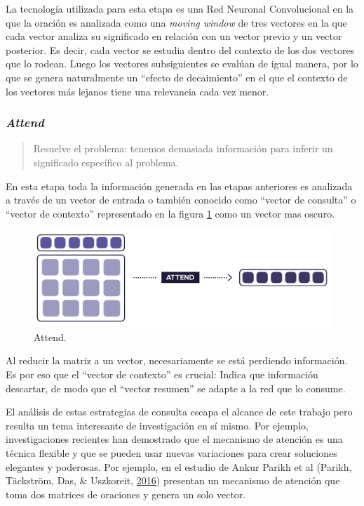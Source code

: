 \documentclass[12pt,a4paper,]{scrartcl}
\begin{document}
La tecnología utilizada para esta etapa es una Red Neuronal Convolucional en la que la oración es analizada como una \emph{moving window} de tres vectores en la que cada vector analiza su significado en relación con un vector previo y un vector posterior. Es decir, cada vector se estudia dentro del contexto de los dos vectores que lo rodean. Luego los vectores subsiguientes se evalúan de igual manera, por lo que se genera naturalmente un \enquote{efecto de decaimiento} en el que el contexto de los vectores más lejanos tiene una relevancia cada vez menor.

\hypertarget{attend}{%
\subsubsection{\texorpdfstring{\emph{Attend}}{Attend}}\label{attend}}

\begin{quote}
Resuelve el problema: tenemos demasiada información para inferir un significado específico al problema.
\end{quote}

En esta etapa toda la información generada en las etapas anteriores es analizada a través de un vector de entrada o también conocido como \enquote{vector de consulta} o \enquote{vector de contexto} representado en la figura \ref{fig:formula-attend} como un vector mas oscuro.

\begin{figure}[H]

{\centering \includegraphics{assets/deep-learning-formula-nlp_attend.pdf} 

}

\caption{Attend.}\label{fig:formula-attend}
\end{figure}

Al reducir la matriz a un vector, necesariamente se está perdiendo información. Es por eso que el \enquote{vector de contexto} es crucial: Indica que información descartar, de modo que el \enquote{vector resumen} se adapte a la red que lo consume.

El análisis de estas estrategias de consulta escapa el alcance de este trabajo pero resulta un tema interesante de investigación en sí mismo. Por ejemplo, investigaciones recientes han demostrado que el mecanismo de atención es una técnica flexible y que se pueden usar nuevas variaciones para crear soluciones elegantes y poderosas. Por ejemplo, en el estudio de Ankur Parikh et al (Parikh, Täckström, Das, \& Uszkoreit, \protect\hyperlink{ref-parikh-etal-2016-decomposable}{2016}) presentan un mecanismo de atención que toma dos matrices de oraciones y genera un solo vector.
\end{document}
